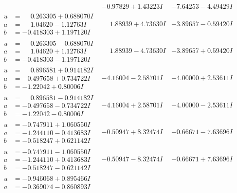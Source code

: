 \documentclass[1p]{elsarticle_modified}
\theoremstyle{definition}
\begin{document}
$$\begin{array}{c|c|c}
 & -0.97829 + 1.43223 I & -7.64253 - 4.49429 I \\ \hline\begin{aligned}
u &= \phantom{-}0.263305 + 0.688070 I \\
a &= \phantom{-}1.04620 - 1.12763 I \\
b &= -0.418303 + 1.197120 I\end{aligned}
 & \phantom{-}1.88939 + 4.73630 I & -3.89657 - 0.59420 I \\ \hline\begin{aligned}
u &= \phantom{-}0.263305 - 0.688070 I \\
a &= \phantom{-}1.04620 + 1.12763 I \\
b &= -0.418303 - 1.197120 I\end{aligned}
 & \phantom{-}1.88939 - 4.73630 I & -3.89657 + 0.59420 I \\ \hline\begin{aligned}
u &= \phantom{-}0.896581 + 0.914182 I \\
a &= -0.497658 + 0.734722 I \\
b &= -1.22042 + 0.80006 I\end{aligned}
 & -4.16004 - 2.58701 I & -4.00000 + 2.53611 I \\ \hline\begin{aligned}
u &= \phantom{-}0.896581 - 0.914182 I \\
a &= -0.497658 - 0.734722 I \\
b &= -1.22042 - 0.80006 I\end{aligned}
 & -4.16004 + 2.58701 I & -4.00000 - 2.53611 I \\ \hline\begin{aligned}
u &= -0.747911 + 1.060550 I \\
a &= -1.244110 - 0.413683 I \\
b &= -0.518247 + 0.621142 I\end{aligned}
 & -0.50947 + 8.32474 I & -0.66671 - 7.63696 I \\ \hline\begin{aligned}
u &= -0.747911 - 1.060550 I \\
a &= -1.244110 + 0.413683 I \\
b &= -0.518247 - 0.621142 I\end{aligned}
 & -0.50947 - 8.32474 I & -0.66671 + 7.63696 I \\ \hline\begin{aligned}
u &= -0.946068 + 0.895466 I \\
a &= -0.369074 - 0.860893 I \\

\end{aligned}
\end{array}$$
\end{document}
